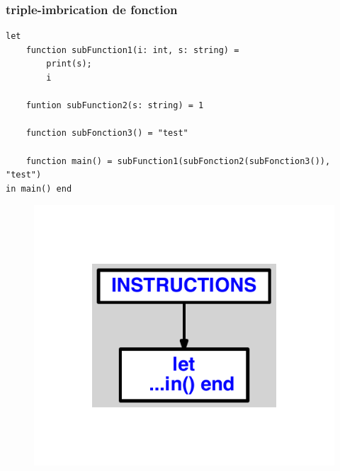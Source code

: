\documentclass{article}
\begin{document}
\subsubsection{triple-imbrication de fonction}
\begin{lstlisting}
let
	function subFunction1(i: int, s: string) =
		print(s);
		i

	funtion subFunction2(s: string) = 1

	function subFonction3() = "test"

	function main() = subFunction1(subFonction2(subFonction3()), "test")
in main() end
\end{lstlisting}
\newpage
\begin{figure}[H]
\centering
\includegraphics[max width=\textwidth]{ast/ast_245.pdf}
\end{figure}
\newpage
\end{document}
